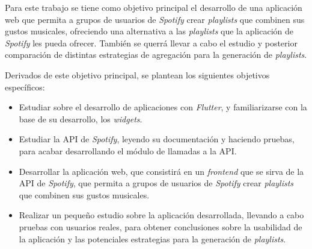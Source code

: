Para este trabajo se tiene como objetivo principal el desarrollo de una aplicación web que permita a grupos de usuarios de \textit{Spotify}
crear \textit{playlists} que combinen sus gustos musicales, ofreciendo una alternativa a las \textit{playlists} que la aplicación de \textit{Spotify}
 les pueda ofrecer. También se querrá llevar a cabo el estudio y posterior comparación de distintas estrategias de agregación para la generación de \textit{playlists}.
 
 Derivados de este objetivo principal, se plantean los siguientes objetivos específicos:

\begin{itemize}
  \item Estudiar sobre el desarrollo de aplicaciones con \textit{Flutter}, y familiarizarse con la base de su desarrollo, los \textit{widgets}.
  \item Estudiar la API de \textit{Spotify}, leyendo su documentación y haciendo pruebas, para acabar desarrollando el módulo de llamadas a la API.
  \item Desarrollar la aplicación web, que consistirá en un \textit{frontend} que se sirva de la API de \textit{Spotify}, que permita a grupos de 
  usuarios de \textit{Spotify} crear \textit{playlists} que combinen sus gustos musicales.
  \item Realizar un pequeño estudio sobre la aplicación desarrollada, llevando a cabo pruebas con usuarios reales, para obtener conclusiones sobre 
la usabilidad de la aplicación y las potenciales estrategias para la generación de \textit{playlists}.
\end{itemize}
